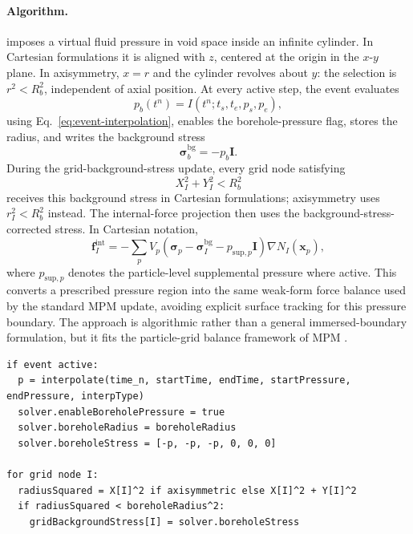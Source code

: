 \paragraph{Algorithm.}
 imposes a virtual fluid pressure in void space inside an infinite cylinder. In Cartesian formulations it is aligned with $z$, centered at the origin in the $x$-$y$ plane. In axisymmetry, $x=r$ and the cylinder revolves about $y$: the selection is $r^2<R_b^2$, independent of axial position. At every active step, the event evaluates
\begin{equation}
  p_b(t^n)=I(t^n;t_s,t_e,p_s,p_e),
\end{equation}
using Eq.~\eqref{eq:event-interpolation}, enables the borehole-pressure flag, stores the radius, and writes the background stress
\begin{equation}
  \boldsymbol{\sigma}^{\mathrm{bg}}_b = -p_b\mathbf{I}.
\end{equation}
During the grid-background-stress update, every grid node satisfying
\begin{equation}
  X_I^2+Y_I^2 < R_b^2
\end{equation}
receives this background stress in Cartesian formulations; axisymmetry uses $r_I^2<R_b^2$ instead. The internal-force projection then uses the background-stress-corrected stress. In Cartesian notation,
\begin{equation}
  \mathbf{f}^{\mathrm{int}}_I
  = -\sum_p V_p\left(\boldsymbol{\sigma}_p-\boldsymbol{\sigma}^{\mathrm{bg}}_I-p_{\mathrm{sup},p}\mathbf{I}\right)\nabla N_I(\mathbf{x}_p),
  \label{eq:background-stress-force}
\end{equation}
where $p_{\mathrm{sup},p}$ denotes the particle-level supplemental pressure where active.  This converts a prescribed pressure region into the same weak-form force balance used by the standard MPM update, avoiding explicit surface tracking for this pressure boundary.  The approach is algorithmic rather than a general immersed-boundary formulation, but it fits the particle-grid balance framework of MPM \cite{sulsky1994history,sulsky1995solid}.

\begin{lstlisting}[caption={BoreholePressure event pseudocode.}]
if event active:
  p = interpolate(time_n, startTime, endTime, startPressure, endPressure, interpType)
  solver.enableBoreholePressure = true
  solver.boreholeRadius = boreholeRadius
  solver.boreholeStress = [-p, -p, -p, 0, 0, 0]

for grid node I:
  radiusSquared = X[I]^2 if axisymmetric else X[I]^2 + Y[I]^2
  if radiusSquared < boreholeRadius^2:
    gridBackgroundStress[I] = solver.boreholeStress
\end{lstlisting}

